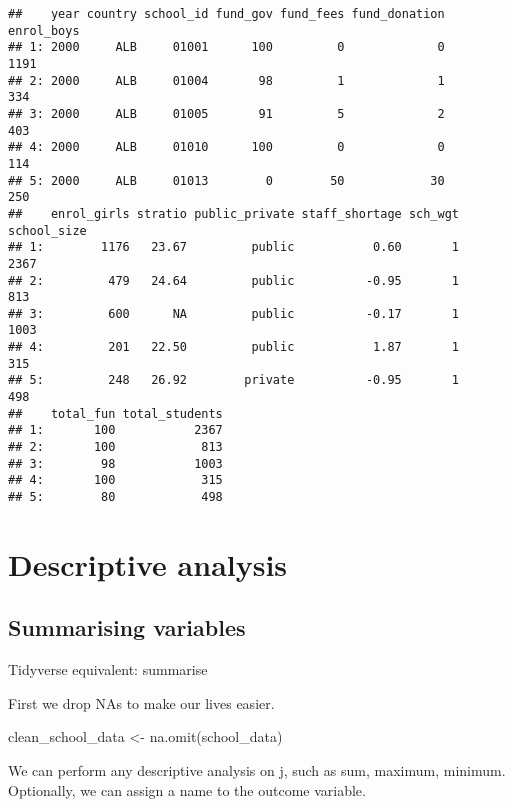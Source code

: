 \documentclass[
]{article}
\newenvironment{Shaded}{\begin{snugshade}}{\end{snugshade}}
\newcommand{\FunctionTok}[1]{\textcolor[rgb]{0.00,0.00,0.00}{#1}}
\newcommand{\NormalTok}[1]{#1}
\newcommand{\OtherTok}[1]{\textcolor[rgb]{0.56,0.35,0.01}{#1}}
\begin{document}
\begin{verbatim}
##    year country school_id fund_gov fund_fees fund_donation enrol_boys
## 1: 2000     ALB     01001      100         0             0       1191
## 2: 2000     ALB     01004       98         1             1        334
## 3: 2000     ALB     01005       91         5             2        403
## 4: 2000     ALB     01010      100         0             0        114
## 5: 2000     ALB     01013        0        50            30        250
##    enrol_girls stratio public_private staff_shortage sch_wgt school_size
## 1:        1176   23.67         public           0.60       1        2367
## 2:         479   24.64         public          -0.95       1         813
## 3:         600      NA         public          -0.17       1        1003
## 4:         201   22.50         public           1.87       1         315
## 5:         248   26.92        private          -0.95       1         498
##    total_fun total_students
## 1:       100           2367
## 2:       100            813
## 3:        98           1003
## 4:       100            315
## 5:        80            498
\end{verbatim}

\hypertarget{descriptive-analysis}{%
\section{Descriptive analysis}\label{descriptive-analysis}}

\hypertarget{summarising-variables}{%
\subsection{Summarising variables}\label{summarising-variables}}

{Tidyverse equivalent: summarise}

First we drop NAs to make our lives easier.

\begin{Shaded}
\begin{Highlighting}[]
\NormalTok{clean\_school\_data }\OtherTok{\textless{}{-}} \FunctionTok{na.omit}\NormalTok{(school\_data)}
\end{Highlighting}
\end{Shaded}

We can perform any descriptive analysis on j, such as sum, maximum,
minimum. Optionally, we can assign a name to the outcome variable.
\end{document}
